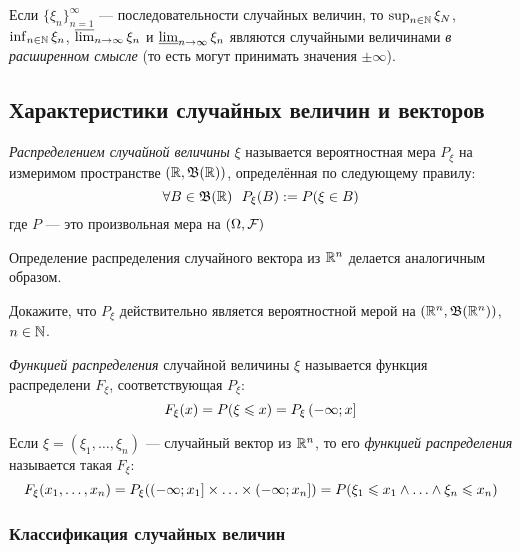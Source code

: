 \begin{proposition}
	Если $\{\xi_n\}_{n = 1}^\infty$ --- последовательности случайных величин, то $\sup_{n \in \mathbb{N}} \xi_N$, $\inf_{n \in \mathbb{N}} \xi_n$, $\varlimsup_{n \to \infty} \xi_n$ и $\varliminf_{n \to \infty} \xi_n$ являются случайными величинами \textit{в расширенном смысле} (то есть могут принимать значения $\pm\infty$).
\end{proposition}

\subsection{Характеристики случайных величин и векторов}

\begin{definition}
	\textit{Распределением случайной величины} $\xi$ называется вероятностная мера $P_\xi$ на измеримом пространстве $(\mathbb{R}, \mathfrak{B}(\mathbb{R}))$, определённая по следующему правилу:
	\[
		\forall B \in \mathfrak{B}(\mathbb{R})\ \  P_\xi(B) := P(\xi \in B)
	\]
	где $P$ --- это произвольная мера на $(\Omega, \mathcal{F})$
\end{definition}

\begin{note}
	Определение распределения случайного вектора из $\mathbb{R}^n$ делается аналогичным образом.
\end{note}

\begin{exercise}
	Докажите, что $P_\xi$ действительно является вероятностной мерой на $(\mathbb{R}^n, \mathfrak{B}(\mathbb{R}^n))$, $n \in \mathbb{N}$.
\end{exercise}

\begin{definition}
	\textit{Функцией распределения} случайной величины $\xi$ называется функция распределени $F_\xi$, соответствующая $P_\xi$:
	\[
		F_\xi(x) = P(\xi \leqslant x) = P_\xi\left(-\infty; x\right]
	\]
\end{definition}

\begin{definition}
	Если $\xi = (\xi_1, \ldots, \xi_n)$ --- случайный вектор из $\mathbb{R}^n$, то его \textit{функцией распределения} называется такая $F_\xi$:
	\[
		F_\xi(x_1, \ldots, x_n) = P_\xi(\left(-\infty; x_1\right] \times \ldots \times \left(-\infty; x_n\right]) = P(\xi_1 \leqslant x_1 \wedge \ldots \wedge \xi_n \leqslant x_n)
	\]
\end{definition}

\subsubsection*{Классификация случайных величин}

